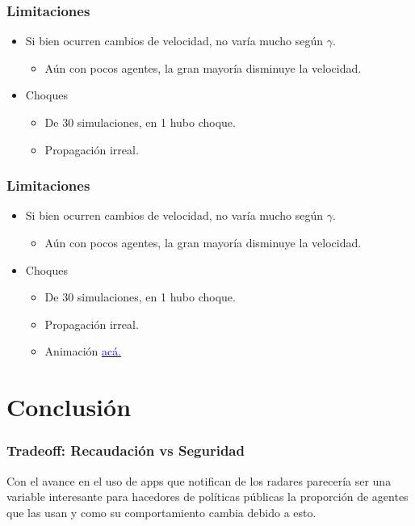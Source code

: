 \documentclass[10pt, compress]{beamer}
\begin{document}
\begin{frame}[fragile]
\frametitle{Limitaciones}

\begin{itemize}
\item Si bien ocurren cambios de velocidad, no var\'ia mucho seg\'un $\gamma$. 
	\begin{itemize}
	\item A\'un con pocos agentes, la gran mayor\'ia disminuye la velocidad.
	\end{itemize}
\item Choques
	\begin{itemize}
	\item De 30 simulaciones, en 1 hubo choque.
	\item Propagaci\'on irreal.
	\end{itemize}
\end{itemize}
\addtocounter{framenumber}{-1}
\end{frame}

\begin{frame}[fragile]
\frametitle{Limitaciones}

\begin{itemize}
\item Si bien ocurren cambios de velocidad, no var\'ia mucho seg\'un $\gamma$. 
	\begin{itemize}
	\item A\'un con pocos agentes, la gran mayor\'ia disminuye la velocidad.
	\end{itemize}
\item Choques
	\begin{itemize}
	\item De 30 simulaciones, en 1 hubo choque.
	\item Propagaci\'on irreal.
	\item Animaci\'on \href{https://www.youtube.com/watch?v=Yan5BorT-o0}{\textcolor{blue}{ac\'a.}}
	\end{itemize}
\end{itemize}
\addtocounter{framenumber}{-1}
\end{frame}

\section{Conclusi\'on}
\addtocounter{framenumber}{-1}
\begin{frame}[fragile]
\frametitle{Tradeoff: Recaudaci\'on vs Seguridad}
Con el avance en el uso de apps que notifican de los radares parecer\'ia ser una variable interesante para hacedores de pol\'iticas p\'ublicas la proporci\'on de agentes que las usan y como su comportamiento cambia debido a esto.
\end{frame}
\end{document}
